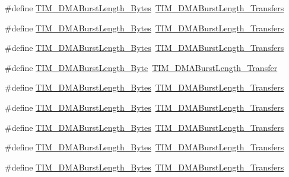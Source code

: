 \begin{DoxyCompactItemize}
\#define \hyperlink{group___t_i_m___legacy_ga672117a7dafcd778fe8e86db423b07e9}{T\+I\+M\+\_\+\+D\+M\+A\+Burst\+Length\+\_\+Bytes}~\hyperlink{group___t_i_m___d_m_a___burst___length_gafb644e6033f7b46c602b02754b69fde0}{T\+I\+M\+\_\+\+D\+M\+A\+Burst\+Length\+\_\+Transfers}
\item 
\#define \hyperlink{group___t_i_m___legacy_gacffd0dc1f04aa06624a4980dcae6eede}{T\+I\+M\+\_\+\+D\+M\+A\+Burst\+Length\+\_\+Bytes}~\hyperlink{group___t_i_m___d_m_a___burst___length_ga5b2c97f650a3c1726965187d852b8cc5}{T\+I\+M\+\_\+\+D\+M\+A\+Burst\+Length\+\_\+Transfers}
\item 
\#define \hyperlink{group___t_i_m___legacy_ga9c4d457417b1ba72ed0ae9886a75547a}{T\+I\+M\+\_\+\+D\+M\+A\+Burst\+Length\+\_\+Bytes}~\hyperlink{group___t_i_m___d_m_a___burst___length_gaed9f2afef174079f6eb6927abd995b9b}{T\+I\+M\+\_\+\+D\+M\+A\+Burst\+Length\+\_\+Transfers}
\item 
\#define \hyperlink{group___t_i_m___legacy_gad915c67fae262b887f4f074809448309}{T\+I\+M\+\_\+\+D\+M\+A\+Burst\+Length\+\_\+Byte}~\hyperlink{group___t_i_m___d_m_a___burst___length_gab87f91f1c5583b9888cb6bb37fc639e2}{T\+I\+M\+\_\+\+D\+M\+A\+Burst\+Length\+\_\+Transfer}
\item 
\#define \hyperlink{group___t_i_m___legacy_gabed2d89b663148923f4a7ca63d62d947}{T\+I\+M\+\_\+\+D\+M\+A\+Burst\+Length\+\_\+Bytes}~\hyperlink{group___t_i_m___d_m_a___burst___length_ga829504c3e8c90a9445f6a223bc3034f8}{T\+I\+M\+\_\+\+D\+M\+A\+Burst\+Length\+\_\+Transfers}
\item 
\#define \hyperlink{group___t_i_m___legacy_gad06dbc68a994da99b017a18a7197c0ad}{T\+I\+M\+\_\+\+D\+M\+A\+Burst\+Length\+\_\+Bytes}~\hyperlink{group___t_i_m___d_m_a___burst___length_ga3a99863a0925e0cc9a11b91aade66f11}{T\+I\+M\+\_\+\+D\+M\+A\+Burst\+Length\+\_\+Transfers}
\item 
\#define \hyperlink{group___t_i_m___legacy_ga620ce560a1d7a6d6769cacd2a2ead48d}{T\+I\+M\+\_\+\+D\+M\+A\+Burst\+Length\+\_\+Bytes}~\hyperlink{group___t_i_m___d_m_a___burst___length_ga84bfeb309593a1ac580e233bf7514b36}{T\+I\+M\+\_\+\+D\+M\+A\+Burst\+Length\+\_\+Transfers}
\item 
\#define \hyperlink{group___t_i_m___legacy_gaf9ac4a4cfd3dcfb7ba859898e702c881}{T\+I\+M\+\_\+\+D\+M\+A\+Burst\+Length\+\_\+Bytes}~\hyperlink{group___t_i_m___d_m_a___burst___length_ga44f8aa51fbe8887a5f3c37a0e776902c}{T\+I\+M\+\_\+\+D\+M\+A\+Burst\+Length\+\_\+Transfers}
\item 
\#define \hyperlink{group___t_i_m___legacy_ga7a9cc659b4fc010a31815254f6b57e3f}{T\+I\+M\+\_\+\+D\+M\+A\+Burst\+Length\+\_\+Bytes}~\hyperlink{group___t_i_m___d_m_a___burst___length_ga8be40a21654eea72e9c1bf9922675b22}{T\+I\+M\+\_\+\+D\+M\+A\+Burst\+Length\+\_\+Transfers}

\end{DoxyCompactItemize}

